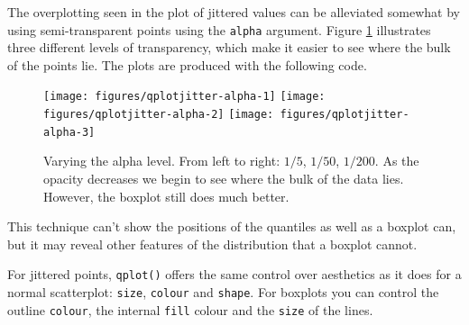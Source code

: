 The overplotting seen in the plot of jittered values can be alleviated
somewhat by using semi-transparent points using the \texttt{alpha}
argument. Figure \ref{fig:jitter-alpha} illustrates three different
levels of transparency, which make it easier to see where the bulk of
the points lie. The plots are produced with the following code.

\begin{Shaded}
\begin{Highlighting}[]
\StringTok{ }  \NormalTok{,}
  \NormalTok{(} \NormalTok{/}\StringTok{ }\NormalTok{))}
\StringTok{ }  \NormalTok{,}
  \NormalTok{(} \NormalTok{/}\StringTok{ }\NormalTok{))}
\StringTok{ }  \NormalTok{,}
  \NormalTok{(} \NormalTok{/}\StringTok{ }\NormalTok{))}
\end{Highlighting}
\end{Shaded}

\begin{figure}

{\centering \texttt{[image: figures/qplotjitter-alpha-1]} \texttt{[image: figures/qplotjitter-alpha-2]} \texttt{[image: figures/qplotjitter-alpha-3]} 

}

\caption{Varying the alpha level.  From left to right: $1/5$, $1/50$, $1/200$.  As the opacity decreases we begin to see where the bulk of the data lies.  However, the boxplot still does much better.\label{fig:jitter-alpha}}
\end{figure}

This technique can't show the positions of the quantiles as well as a
boxplot can, but it may reveal other features of the distribution that a
boxplot cannot.

For jittered points, \texttt{qplot()} offers the same control over
aesthetics as it does for a normal scatterplot: \texttt{size},
\texttt{colour} and \texttt{shape}. For boxplots you can control the
outline \texttt{colour}, the internal \texttt{fill} colour and the
\texttt{size} of the lines.

